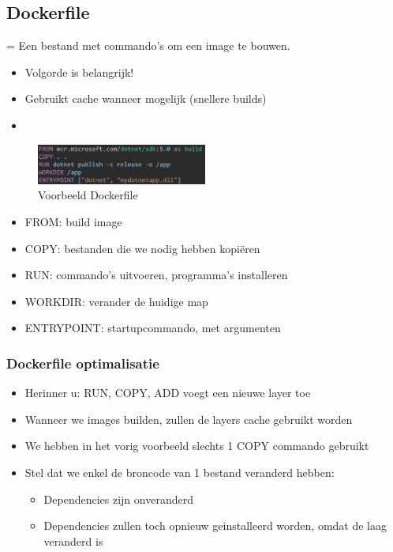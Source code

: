 \documentclass{article}
\begin{document}
\subsection{Dockerfile}

= Een bestand met commando's om een image te bouwen.

\begin{itemize}
    \item Volgorde is belangrijk!
    \item Gebruikt cache wanneer mogelijk (snellere builds)
    \item 
\end{itemize}

\begin{figure}[H]
    \centering
    \includegraphics[width=0.5\textwidth]{dockerfile.png}
    \caption{Voorbeeld Dockerfile}
\end{figure}

\begin{itemize}
    \item FROM: build image
    \item COPY: bestanden die we nodig hebben kopiëren
    \item RUN: commando's uitvoeren, programma's installeren
    \item WORKDIR: verander de huidige map
    \item ENTRYPOINT: startupcommando, met argumenten
\end{itemize}

\subsubsection{Dockerfile optimalisatie}

\begin{itemize}
    \item Herinner u: RUN, COPY, ADD voegt een nieuwe layer toe
    \item Wanneer we images builden, zullen de layers cache gebruikt worden
    \item We hebben in het vorig voorbeeld slechts 1 COPY commando gebruikt
    \item Stel dat we enkel de broncode van 1 bestand veranderd hebben:
    \begin{itemize}
        \item Dependencies zijn onveranderd
        \item Dependencies zullen toch opnieuw geinstalleerd worden, omdat de laag veranderd is
    \end{itemize}
\end{itemize}
\end{document}
